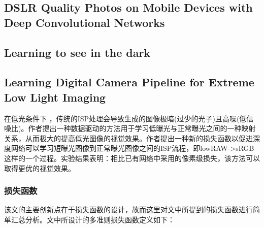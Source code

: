 \documentclass[letterpaper,12pt]{article}
\begin{document}
	\subsection{DSLR Quality Photos on Mobile Devices with Deep Convolutional Networks}
	\subsection{Learning to see in the dark}
	\subsection{Learning Digital Camera Pipeline for Extreme Low Light Imaging}
	
	在低光条件下 ，传统的ISP处理会导致生成的图像极暗(过少的光子)且高噪(低信噪比)。作者提出一种数据驱动的方法用于学习低曝光与正常曝光之间的一种映射关系，从而极大的提高低光图像的视觉效果。作者提出一种新的损失函数以促进深度网络可以学习短曝光图像到正常曝光图像之间的ISP流程，即lowRAW->sRGB这样的一个过程。实验结果表明：相比已有网络中采用的像素级损失，该方法可以取得更优的视觉效果。
	
		\subsubsection{损失函数}
		
		该文的主要创新点在于损失函数的设计，故而这里对文中所提到的损失函数进行简单汇总分析。文中所设计的多准则损失函数定义如下：
		
\end{document}
